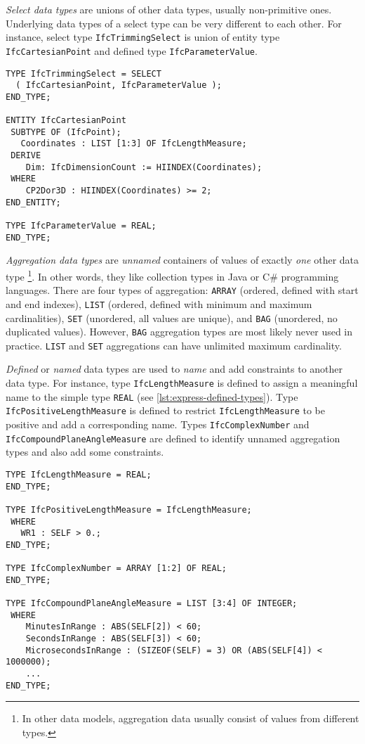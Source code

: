 \emph{Select data types} are unions of other data types, usually non-primitive ones.
Underlying data types of a select type can be very different to each other.
For instance, select type \texttt{IfcTrimmingSelect} is union of entity type \texttt{IfcCartesianPoint} and defined type \texttt{IfcParameterValue}.



\begin{lstlisting}[caption={Printout of select type \texttt{IfcTrimmingSelect} and its underlying types.},label=lst:express-select-types]
TYPE IfcTrimmingSelect = SELECT
  ( IfcCartesianPoint, IfcParameterValue );
END_TYPE;

ENTITY IfcCartesianPoint
 SUBTYPE OF (IfcPoint);
   Coordinates : LIST [1:3] OF IfcLengthMeasure;
 DERIVE
    Dim: IfcDimensionCount := HIINDEX(Coordinates);
 WHERE
    CP2Dor3D : HIINDEX(Coordinates) >= 2;
END_ENTITY;

TYPE IfcParameterValue = REAL;
END_TYPE;
\end{lstlisting}



\emph{Aggregation data types} are \emph{unnamed} containers of values of exactly \emph{one} other data type
\footnote{In other data models, aggregation data usually consist of values from different types.}.
In other words, they like collection types in Java or C{\#} programming languages.
There are four types of aggregation: \texttt{ARRAY} (ordered, defined with start and end indexes), \texttt{LIST} (ordered, defined with minimum and maximum cardinalities), \texttt{SET} (unordered, all values are unique), and \texttt{BAG} (unordered, no duplicated values).
However, \texttt{BAG} aggregation types are most likely never used in practice.
\texttt{LIST} and \texttt{SET} aggregations can have unlimited maximum cardinality.



\emph{Defined} or \emph{named} data types are used to \emph{name} and add constraints to another data type.
For instance, type \texttt{Ifc\-Length\-Measure} is defined to assign a meaningful name to the simple type \texttt{REAL} (see \autoref{lst:express-defined-types}).
Type \texttt{Ifc\-Positive\-Length\-Measure} is defined to restrict \texttt{Ifc\-Length\-Measure} to be positive and add a corresponding name.
Types \texttt{Ifc\-Complex\-Number} and \texttt{Ifc\-Compound\-Plane\-Angle\-Measure} are defined to identify unnamed aggregation types and also add some constraints.


\begin{lstlisting}[caption={Printout of several defined data types},label=lst:express-defined-types]
TYPE IfcLengthMeasure = REAL;
END_TYPE;

TYPE IfcPositiveLengthMeasure = IfcLengthMeasure;
 WHERE
   WR1 : SELF > 0.;
END_TYPE;

TYPE IfcComplexNumber = ARRAY [1:2] OF REAL;
END_TYPE;

TYPE IfcCompoundPlaneAngleMeasure = LIST [3:4] OF INTEGER;
 WHERE
    MinutesInRange : ABS(SELF[2]) < 60;
    SecondsInRange : ABS(SELF[3]) < 60;
    MicrosecondsInRange : (SIZEOF(SELF) = 3) OR (ABS(SELF[4]) < 1000000);
    ...
END_TYPE;
\end{lstlisting}

